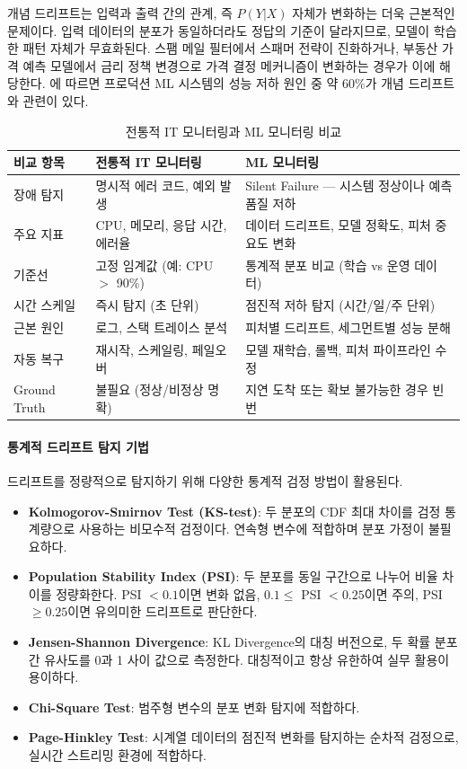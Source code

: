 개념 드리프트는 입력과 출력 간의 관계, 즉 $P(Y|X)$ 자체가 변화하는 더욱 근본적인 문제이다. 입력 데이터의 분포가 동일하더라도 정답의 기준이 달라지므로, 모델이 학습한 패턴 자체가 무효화된다. 스팸 메일 필터에서 스패머 전략이 진화하거나, 부동산 가격 예측 모델에서 금리 정책 변경으로 가격 결정 메커니즘이 변화하는 경우가 이에 해당한다. \cite{kreuzberger2023machine}에 따르면 프로덕션 ML 시스템의 성능 저하 원인 중 약 60\%가 개념 드리프트와 관련이 있다.

\begin{table}[htbp]
\centering
\caption{전통적 IT 모니터링과 ML 모니터링 비교}
\label{tab:14_it_vs_ml_monitoring}
\begin{tabularx}{\textwidth}{p{2.5cm}XX}
\toprule
\textbf{비교 항목} & \textbf{전통적 IT 모니터링} & \textbf{ML 모니터링} \\
\midrule
장애 탐지 & 명시적 에러 코드, 예외 발생 & Silent Failure --- 시스템 정상이나 예측 품질 저하 \\
주요 지표 & CPU, 메모리, 응답 시간, 에러율 & 데이터 드리프트, 모델 정확도, 피처 중요도 변화 \\
기준선 & 고정 임계값 (예: CPU $>$ 90\%) & 통계적 분포 비교 (학습 vs 운영 데이터) \\
시간 스케일 & 즉시 탐지 (초 단위) & 점진적 저하 탐지 (시간/일/주 단위) \\
근본 원인 & 로그, 스택 트레이스 분석 & 피처별 드리프트, 세그먼트별 성능 분해 \\
자동 복구 & 재시작, 스케일링, 페일오버 & 모델 재학습, 롤백, 피처 파이프라인 수정 \\
Ground Truth & 불필요 (정상/비정상 명확) & 지연 도착 또는 확보 불가능한 경우 빈번 \\
\bottomrule
\end{tabularx}
\end{table}

\paragraph{통계적 드리프트 탐지 기법}

드리프트를 정량적으로 탐지하기 위해 다양한 통계적 검정 방법이 활용된다.

\begin{itemize}
    \item \textbf{Kolmogorov-Smirnov Test (KS-test)}: 두 분포의 CDF 최대 차이를 검정 통계량으로 사용하는 비모수적 검정이다. 연속형 변수에 적합하며 분포 가정이 불필요하다.
    \item \textbf{Population Stability Index (PSI)}: 두 분포를 동일 구간으로 나누어 비율 차이를 정량화한다. PSI $< 0.1$이면 변화 없음, $0.1 \leq$ PSI $< 0.25$이면 주의, PSI $\geq 0.25$이면 유의미한 드리프트로 판단한다.
    \item \textbf{Jensen-Shannon Divergence}: KL Divergence의 대칭 버전으로, 두 확률 분포 간 유사도를 0과 1 사이 값으로 측정한다. 대칭적이고 항상 유한하여 실무 활용이 용이하다.
    \item \textbf{Chi-Square Test}: 범주형 변수의 분포 변화 탐지에 적합하다.
    \item \textbf{Page-Hinkley Test}: 시계열 데이터의 점진적 변화를 탐지하는 순차적 검정으로, 실시간 스트리밍 환경에 적합하다.
\end{itemize}

